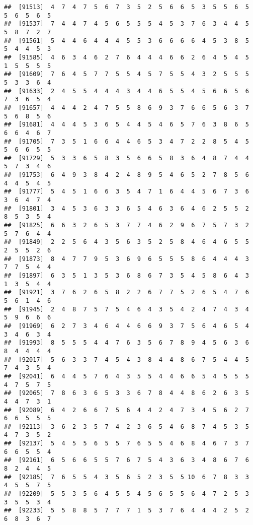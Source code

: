 \documentclass[
]{book}
\begin{document}
\begin{verbatim}
##  [91513]  4  7  4  7  5  6  7  3  5  2  5  6  6  5  3  5  5  6  5  5  6  5  6  5
##  [91537]  7  4  4  7  4  5  6  5  5  5  4  5  3  7  6  3  4  4  5  5  8  7  2  7
##  [91561]  5  4  4  6  4  4  4  5  5  3  6  6  6  6  4  5  3  8  5  5  4  4  5  3
##  [91585]  4  6  3  4  6  2  7  6  4  4  4  6  6  2  6  4  5  4  5  1  5  5  5  5
##  [91609]  7  6  4  5  7  7  5  5  4  5  7  5  5  4  3  2  5  5  5  5  3  3  6  4
##  [91633]  2  4  5  5  4  4  4  3  4  4  6  5  5  4  5  6  6  5  6  7  3  6  5  4
##  [91657]  4  4  4  2  4  7  5  5  8  6  9  3  7  6  6  5  6  3  7  5  6  8  5  6
##  [91681]  4  4  4  5  3  6  5  4  4  5  4  6  5  7  6  3  8  6  5  6  6  4  6  7
##  [91705]  7  3  5  1  6  6  4  4  6  5  3  4  7  2  2  8  5  4  5  5  6  6  5  5
##  [91729]  5  3  3  6  5  8  3  5  6  6  5  8  3  6  4  8  7  4  4  5  7  3  4  6
##  [91753]  6  4  9  3  8  4  2  4  8  9  5  4  6  5  2  7  8  5  6  4  4  5  4  5
##  [91777]  5  4  5  1  6  6  3  5  4  7  1  6  4  4  5  6  7  3  6  3  6  4  7  4
##  [91801]  3  4  5  3  6  3  3  6  5  4  6  3  6  4  6  2  5  5  2  8  5  3  5  4
##  [91825]  6  6  3  2  6  5  3  7  7  4  6  2  9  6  7  5  7  3  2  5  7  6  4  4
##  [91849]  2  2  5  6  4  3  5  6  3  5  2  5  8  4  6  4  6  5  5  2  5  5  2  6
##  [91873]  8  4  7  7  9  5  3  6  9  6  5  5  5  8  6  4  4  4  3  7  7  5  4  4
##  [91897]  6  3  5  1  3  5  3  6  8  6  7  3  5  4  5  8  6  4  3  1  3  5  4  4
##  [91921]  3  7  6  2  6  5  8  2  2  6  7  7  5  2  6  5  4  7  6  5  6  1  4  6
##  [91945]  2  4  8  7  5  7  5  4  6  4  3  5  4  2  4  7  4  3  4  5  9  6  6  6
##  [91969]  6  2  7  3  4  6  4  4  6  6  9  3  7  5  6  4  6  5  4  3  4  6  3  4
##  [91993]  8  5  5  5  4  4  7  6  3  5  6  7  8  9  4  5  6  3  6  8  4  4  4  4
##  [92017]  5  6  3  3  7  4  5  4  3  8  4  4  8  6  7  5  4  4  5  7  4  3  5  4
##  [92041]  6  4  4  5  7  6  4  3  5  5  4  4  6  6  5  4  5  5  5  4  7  5  7  5
##  [92065]  7  8  6  3  6  5  3  3  6  7  8  4  4  8  6  2  6  3  5  4  4  7  3  1
##  [92089]  6  4  2  6  6  7  5  6  4  4  2  4  7  3  4  5  6  2  7  6  6  5  5  5
##  [92113]  3  6  2  3  5  7  4  2  3  6  5  4  6  8  7  4  5  3  5  4  7  3  5  2
##  [92137]  5  4  5  5  6  5  5  7  6  5  5  4  6  8  4  6  7  3  7  6  6  5  5  4
##  [92161]  6  5  6  6  5  5  7  6  7  5  4  3  6  3  4  8  6  7  6  8  2  4  4  5
##  [92185]  7  6  5  5  4  3  5  6  5  2  3  5  5 10  6  7  8  3  3  4  5  5  7  5
##  [92209]  5  5  3  5  6  4  5  5  4  5  6  5  5  6  4  7  2  5  3  3  5  5  3  4
##  [92233]  5  5  8  8  5  7  7  7  1  5  3  7  6  4  4  4  2  5  2  6  8  3  6  7

\end{verbatim}
\end{document}

